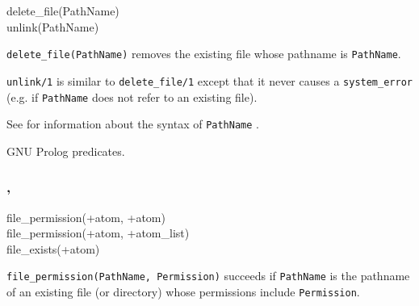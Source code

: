 \begin{TemplatesOneCol}
delete\_file(PathName)\\
unlink(PathName)

\end{TemplatesOneCol}

\Description

\texttt{delete\_file(PathName)} removes the existing file whose pathname is
\texttt{PathName}.

\texttt{unlink/1} is similar to \texttt{delete\_file/1} except that it never
causes a \texttt{system\_error} (e.g. if \texttt{PathName} does not refer to
an existing file).

See  for information about the syntax of
\texttt{PathName} .

\begin{PlErrors}





\end{PlErrors}

\Portability

GNU Prolog predicates.

\subsubsection{,\label{file-permission/2}
               }

\begin{TemplatesOneCol}
file\_permission(+atom, +atom)\\
file\_permission(+atom, +atom\_list)\\
file\_exists(+atom)

\end{TemplatesOneCol}

\Description

\texttt{file\_permission(PathName, Permission)} succeeds if
\texttt{PathName} is the pathname of an existing file (or directory) whose
permissions include \texttt{Permission}.

